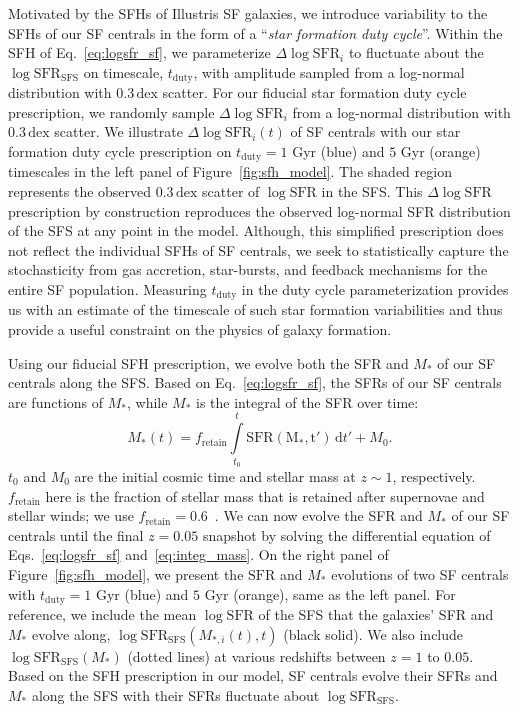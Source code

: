 \documentclass[12pt, letterpaper, preprint, tighten]{aastex62}
\newcommand{\edt}[1]{{\color{dred}{\bf} #1}}
\newcommand{\beq}{\begin{equation}}
\newcommand{\eeq}{\end{equation}}
\newcommand{\logsfr}{\log\mathrm{SFR}}
\newcommand{\logsfrsfs}{\log\mathrm{SFR}_\mathrm{SFS}}
\begin{document}
Motivated by the SFHs of Illustris SF galaxies, we introduce variability
to the SFHs of our SF centrals in the form of a ``\emph{star formation duty cycle}''.
Within the SFH of Eq.~\ref{eq:logsfr_sf}, we parameterize $\Delta \logsfr_i$ to
fluctuate about the $\logsfrsfs$ on timescale, $t_\mathrm{duty}$, with
amplitude sampled from a log-normal distribution with $0.3\,\mathrm{dex}$
scatter. For our fiducial star formation duty cycle prescription, we randomly
sample $\Delta \logsfr_i$ from a log-normal distribution with
\edt{$0.3\,\mathrm{dex}$ scatter}.
We illustrate $\Delta \logsfr_i(t)$ of SF centrals with our star formation
duty cycle prescription on $t_\mathrm{duty}=1$ Gyr (blue) and $5$ Gyr (orange)
timescales in the left panel of Figure~\ref{fig:sfh_model}.
The shaded region represents the observed $0.3\,\mathrm{dex}$ scatter of
$\logsfr$ in the SFS. This $\Delta \logsfr$ prescription by construction
reproduces the observed log-normal SFR distribution of the SFS at any point in 
the model. Although, this simplified prescription does not reflect the individual 
SFHs of SF centrals, we seek to statistically capture the stochasticity from 
gas accretion, star-bursts, and feedback mechanisms for the entire SF population.
Measuring $t_\mathrm{duty}$ in the duty cycle parameterization provides us with 
an estimate of the timescale of such star formation variabilities and thus provide 
a useful constraint on the physics of galaxy formation.

Using our fiducial SFH prescription, we evolve both the SFR and $M_*$
of our SF centrals along the SFS. Based on Eq.~\ref{eq:logsfr_sf},
the SFRs of our SF centrals are functions of $M_*$, while $M_*$
is the integral of the SFR over time:
\beq \label{eq:integ_mass}
M_*(t) = f_\mathrm{retain} \int\limits_{t_0}^{t} \mathrm{SFR(M_*, t')}\,\mathrm{d}t' + M_0.
\eeq
$t_0$ and $M_0$ are the initial cosmic time and stellar mass at $z \sim 1$,
respectively. $f_\mathrm{retain}$ here is the fraction of stellar mass
that is retained after supernovae and stellar winds; we use
$f_\mathrm{retain} = 0.6$~\citep{wetzel2013}. We can now evolve the SFR and
$M_*$ of our SF centrals until the final $z=0.05$ snapshot by
solving the differential equation of Eqs.~\ref{eq:logsfr_sf} and~\ref{eq:integ_mass}.
On the right panel of Figure~\ref{fig:sfh_model}, we present the
$\mathrm{SFR}$ and $M_*$ evolutions of two SF centrals with
$t_\mathrm{duty}=1$ Gyr (blue) and $5$ Gyr (orange), same
as the left panel. For reference, we include the mean $\logsfr$ of the SFS
that the galaxies' SFR and $M_*$ evolve along, $\logsfrsfs(M_{*,i}(t), t)$
(black solid). We also include $\logsfrsfs(M_*)$ (dotted lines) at various
redshifts between $z = 1$ to $0.05$. Based on the SFH prescription in our
model, SF centrals evolve their SFRs and $M_*$ along the SFS
with their SFRs fluctuate about $\logsfrsfs$.
\end{document}
